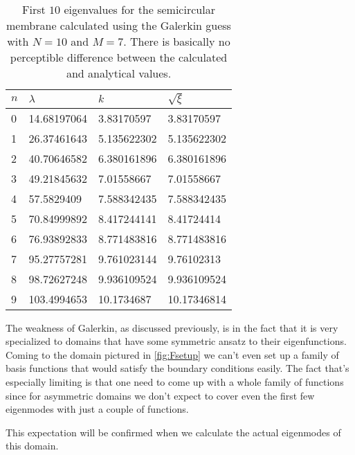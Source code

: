 \documentclass[10pt,a4paper,twocolumn]{article}
\begin{document}
\begin{table}[!t]
    \centering
    \begin{tabular}{|l|l|l|l|}
    \hline
    $n$ & $\lambda$ & $k$ & $\sqrt{\xi}$\\ \hline \hline
    0 & 14.68197064 & 3.83170597  & 3.83170597 \\ \hline
    1 & 26.37461643 & 5.135622302 & 5.135622302\\ \hline
    2 & 40.70646582 & 6.380161896 & 6.380161896\\ \hline
    3 & 49.21845632 & 7.01558667  & 7.01558667\\ \hline
    4 & 57.5829409  & 7.588342435 & 7.588342435\\ \hline
    5 & 70.84999892 & 8.417244141 & 8.41724414\\ \hline
    6 & 76.93892833 & 8.771483816 & 8.771483816\\ \hline
    7 & 95.27757281 & 9.761023144 & 9.76102313\\ \hline
    8 & 98.72627248 & 9.936109524 & 9.936109524\\ \hline
    9 & 103.4994653 & 10.1734687  & 10.17346814\\ \hline
    \end{tabular}
    \caption{First $10$ eigenvalues for the semicircular membrane calculated using the Galerkin guess with $N=10$ and $M=7$. There is basically no perceptible difference between the calculated and analytical values.}
    \label{tab:semi_galerkin}
\end{table}

The weakness of Galerkin, as discussed previously, is in the fact that it is very specialized to domains that have some symmetric ansatz to their eigenfunctions. Coming to the domain pictured in \cref{fig:Fsetup} we can't even set up a family of basis functions that would satisfy the boundary conditions easily. The fact that's especially limiting is that one need to come up with a whole family of functions since for asymmetric domains we don't expect to cover even the first few eigenmodes with just a couple of functions.



This expectation will be confirmed when we calculate the actual eigenmodes of this domain.
\end{document}
